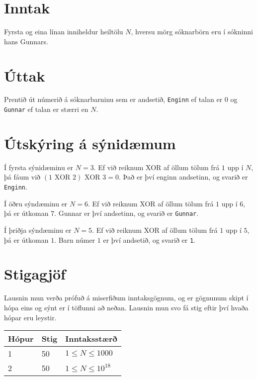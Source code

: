 \section*{Inntak}
Fyrsta og eina línan inniheldur heiltölu $N$, hversu mörg sóknarbörn eru í sókninni hans Gunnars.

\section*{Úttak}
Prentið út númerið á sóknarbarninu sem er andsetið, \texttt{Enginn} ef talan er $0$ og
\texttt{Gunnar} ef talan er stærri en $N$.

\section*{Útskýring á sýnidæmum}
Í fyrsta sýnidæminu er $N = 3$. Ef við reiknum XOR af öllum tölum frá $1$ upp í
$N$, þá fáum við $(1\textrm{ XOR  }2)\textrm{ XOR }3 = 0$. Það er því enginn andsetinn, og svarið er \texttt{Enginn}.

Í öðru sýndæminu er $N = 6$. Ef við reiknum XOR af öllum tölum frá $1$ upp í
$6$, þá er útkoman $7$. Gunnar er því andsetinn, og svarið er \texttt{Gunnar}.

Í þriðja sýndæminu er $N = 5$. Ef við reiknum XOR af öllum tölum frá $1$ upp í
$5$, þá er útkoman $1$. Barn númer $1$ er því andsetið, og svarið er \texttt{1}.

\section*{Stigagjöf}
Lausnin mun verða prófuð á miserfiðum inntaksgögnum, og er gögnunum skipt í
hópa eins og sýnt er í töflunni að neðan. Lausnin mun svo fá stig eftir því
hvaða hópar eru leystir.

\begin{tabular}{|l|l|l|}
\hline
Hópur & Stig & Inntaksstærð  \\ \hline
1     & 50         & $ 1 \le N \le 1000$ \\ \hline
2     & 50         & $ 1 \le N \le 10^{18}$ \\ \hline
\end{tabular}

